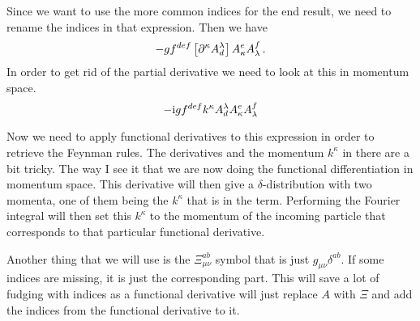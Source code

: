 \documentclass[11pt, english, fleqn, DIV=15, headinclude]{scrartcl}
\begin{document}
Since we want to use the more common indices for the end result, we need to
rename the indices in that expression. Then we have
\[
    - g f^{def} \left[ \partial^\kappa A_d^\lambda \right] A_\kappa^e A_\lambda^f \,.
\]
In order to get rid of the partial derivative we need to look at this in
momentum space.
\[
    - \mathrm i g f^{def} k^\kappa A_d^\lambda A_\kappa^e A_\lambda^f
\]

Now we need to apply functional derivatives to this expression in order to
retrieve the Feynman rules. The derivatives and the momentum $k^\kappa$ in
there are a bit tricky. The way I see it that we are now doing the functional
differentiation in momentum space. This derivative will then give a
$\delta$-distribution with two momenta, one of them being the $k^\kappa$ that
is in the term. Performing the Fourier integral will then set this $k^\kappa$
to the momentum of the incoming particle that corresponds to that particular
functional derivative.

Another thing that we will use is the $\Xi_{\mu\nu}^{ab}$ symbol that is just
$g_{\mu\nu} \delta^{ab}$. If some indices are missing, it is just the
corresponding part. This will save a lot of fudging with indices as a
functional derivative will just replace $A$ with $\Xi$ and add the indices from
the functional derivative to it.
\end{document}
